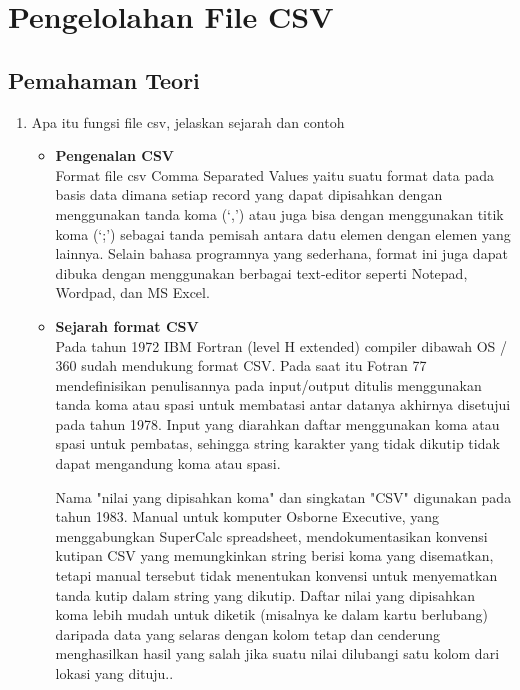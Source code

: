 \chapter{Pengelolahan File CSV}
\section{Pemahaman Teori}
\begin{enumerate}
    \item Apa itu fungsi file csv, jelaskan sejarah dan contoh
    \begin{itemize}
        \item 
        \textbf{Pengenalan CSV} \\
        \hspace*{1cm} Format ﬁle csv Comma Separated Values yaitu suatu format data pada basis data dimana setiap record yang dapat dipisahkan dengan menggunakan tanda koma (‘,’) atau juga bisa dengan menggunakan titik koma (‘;’) sebagai tanda pemisah antara datu elemen dengan elemen yang lainnya. Selain bahasa programnya yang sederhana, format ini juga dapat dibuka dengan menggunakan berbagai text-editor seperti Notepad, Wordpad, dan MS Excel. 
        \item 
        \textbf{Sejarah format CSV} \\
        \hspace*{1cm}Pada tahun 1972 IBM Fortran (level H extended) compiler dibawah  OS / 360 sudah mendukung format CSV. Pada saat itu Fotran 77 mendefinisikan penulisannya pada input/output ditulis menggunakan tanda koma atau spasi untuk membatasi antar datanya akhirnya disetujui pada tahun 1978. Input yang diarahkan daftar menggunakan koma atau spasi untuk pembatas, sehingga string karakter yang tidak dikutip tidak dapat mengandung koma atau spasi.
        
        \hspace*{1cm}Nama "nilai yang dipisahkan koma" dan singkatan "CSV" digunakan pada tahun 1983. Manual untuk komputer Osborne Executive, yang menggabungkan SuperCalc spreadsheet, mendokumentasikan konvensi kutipan CSV yang memungkinkan string berisi koma yang disematkan, tetapi manual tersebut tidak menentukan konvensi untuk menyematkan tanda kutip dalam string yang dikutip. Daftar nilai yang dipisahkan koma lebih mudah untuk diketik (misalnya ke dalam kartu berlubang) daripada data yang selaras dengan kolom tetap dan cenderung menghasilkan hasil yang salah jika suatu nilai dilubangi satu kolom dari lokasi yang dituju.. 
        

\end{itemize}
\end{enumerate}
